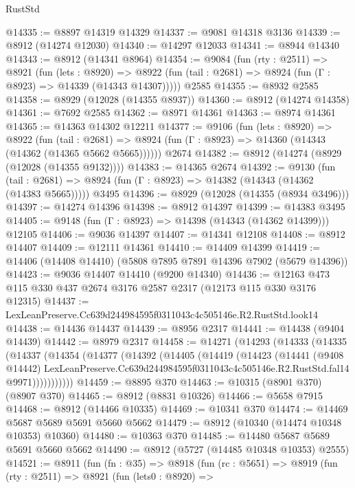 \begin{lexlean}{RustStd}
\begin{coremodule}
@14335 := @8897 @14319 @14329
@14337 := @9081 @14318 @3136
@14339 := @8912 (@14274 @12030)
@14340 := @14297 @12033
@14341 := @8944 @14340
@14343 := @8912 (@14341 @8964)
@14354 := @9084
    (fun (rty : @2511) =>
    @8921
      (fun (lets : @8920) =>
      @8922 (fun (tail : @2681) => @8924 (fun (Γ : @8923) => @14339 (@14343 @14307)))))
    @2585
@14355 := @8932 @2585
@14358 := @8929 (@12028 (@14355 @8937))
@14360 := @8912 (@14274 @14358)
@14361 := @7692 @2585
@14362 := @8971 @14361
@14363 := @8974 @14361
@14365 := @14363 @14302 @12211
@14377 := @9106
    (fun (lets : @8920) =>
    @8922
      (fun (tail : @2681) =>
      @8924 (fun (Γ : @8923) => @14360 (@14343 (@14362 (@14365 @5662 @5665))))))
    @2674
@14382 := @8912 (@14274 (@8929 (@12028 (@14355 @9132))))
@14383 := @14365 @2674
@14392 := @9130
    (fun (tail : @2681) => @8924 (fun (Γ : @8923) => @14382 (@14343 (@14362 (@14383 @5665)))))
    @3495
@14396 := @8929 (@12028 (@14355 (@8934 @3496)))
@14397 := @14274 @14396
@14398 := @8912 @14397
@14399 := @14383 @3495
@14405 := @9148 (fun (Γ : @8923) => @14398 (@14343 (@14362 @14399))) @12105
@14406 := @9036 @14397
@14407 := @14341 @12108
@14408 := @8912 @14407
@14409 := @12111 @14361
@14410 := @14409 @14399
@14419 := @14406 (@14408 @14410) (@5808 @7895 @7891 @14396 @7902 (@5679 @14396))
@14423 := @9036 @14407 @14410 (@9200 @14340)
@14436 := @12163 @473 @115 @330 @437 @2674 @3176 @2587 @2317 (@12173 @115 @330 @3176 @12315)
@14437 := LexLeanPreserve.Cc639d244984595f0311043c4c505146e.R2.RustStd.look14
@14438 := @14436 @14437
@14439 := @8956 @2317
@14441 := @14438 (@9404 @14439)
@14442 := @8979 @2317
@14458 := @14271
    (@14293
      (@14333
        (@14335
          (@14337
            (@14354
              (@14377
                (@14392
                  (@14405
                    (@14419
                      (@14423
                        (@14441
                          (@9408 @14442)
                          LexLeanPreserve.Cc639d244984595f0311043c4c505146e.R2.RustStd.fal14
                          @9971)))))))))))
@14459 := @8895 @370
@14463 := @10315 (@8901 @370) (@8907 @370)
@14465 := @8912 (@8831 @10326)
@14466 := @5658 @7915
@14468 := @8912 (@14466 @10335)
@14469 := @10341 @370
@14474 := @14469 @5687 @5689 @5691 @5660 @5662
@14479 := @8912 (@10340 (@14474 @10348 @10353) @10360)
@14480 := @10363 @370
@14485 := @14480 @5687 @5689 @5691 @5660 @5662
@14490 := @8912 (@5727 (@14485 @10348 @10353) @2555)
@14521 := @8911
    (fun (fn : @35) =>
    @8918
      (fun (rc : @5651) =>
      @8919
        (fun (rty : @2511) =>
        @8921
          (fun (lets0 : @8920) =>

\end{coremodule}
\end{lexlean}
